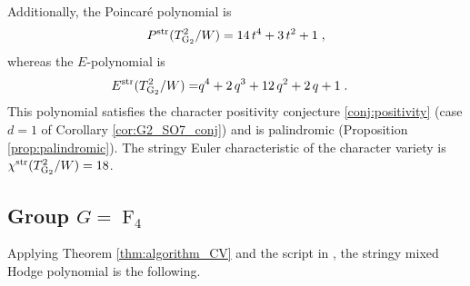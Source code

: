 \documentclass[11pt,english]{amsart}
\numberwithin{equation}{section}
\numberwithin{figure}{section}
\theoremstyle{plain}
\theoremstyle{plain}
\theoremstyle{definition}
\theoremstyle{remark}
\newcommand{\G}{\operatorname{G}}
\newcommand{\F}{\operatorname{F}}
\newcommand{\str}{\textup{str}}
\begin{document}
Additionally, the Poincar\'e polynomial is
\begin{align*}
    P^{\str}(T_{\G_2}^2/W) = 14 \, t^{4} + 3 \, t^{2} + 1\; ,
\end{align*}
whereas the $E$-polynomial is
\begin{align*}
E^{\str}(T_{\G_2}^2/W) =& q^{4} + 2 \, q^{3} + 12 \, q^{2} + 2 \, q + 1\; .
\end{align*}
This polynomial satisfies the character positivity conjecture \ref{conj:positivity} (case $d=1$ of Corollary \ref{cor:G2_SO7_conj}) and is palindromic (Proposition \ref{prop:palindromic}). 
The stringy Euler characteristic of the character variety is $\chi^{\str}(T_{\G_2}^2/W)=18$.

\subsection{Group $G = \F_4$}
Applying Theorem \ref{thm:algorithm_CV} and the script in \cite{code_repository}, the stringy mixed Hodge polynomial is the following.
\allowdisplaybreaks[4]
\end{document}
